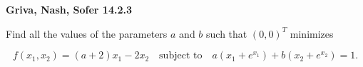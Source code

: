 \textbf{Griva, Nash, Sofer 14.2.3}

Find all the values of the parameters $a$ and $b$ such that $(0, 0)^T$ minimizes

$$
f(x_1, x_2) = (a + 2)x_1 - 2x_2
\quad \text{subject to} \quad 
a \left(x_1 + e^{x_1} \right) + b \left(x_2 + e^{x_2} \right) = 1.
$$


\begin{solution}
    \ \\
    \vfill
\end{solution}